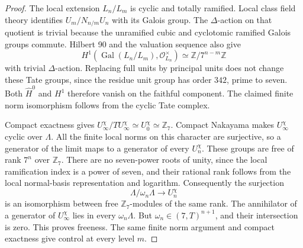 \begin{proof}
The local extension $L_n/L_m$ is cyclic and totally ramified.
Local class field theory identifies
$U_m/N_{n/m}U_n$ with its Galois group. The $\Delta$-action on that
quotient is trivial because the unramified cubic and cyclotomic
ramified Galois groups commute. Hilbert 90 and the valuation sequence
also give
\[
 H^1(\operatorname{Gal}(L_n/L_m),\mathcal O_{L_n}^\times)
 \simeq\mathbb Z/7^{n-m}\mathbb Z
\]
with trivial $\Delta$-action. Replacing full units by principal units
does not change these Tate groups, since the residue unit group has
order $342$, prime to seven. Both
$\widehat H^0$ and $H^1$ therefore vanish on the faithful component.
The claimed finite norm isomorphism follows from the cyclic Tate
complex.

Compact exactness gives
$U_\infty^\chi/TU_\infty^\chi\simeq U_0^\chi\simeq\mathbb Z_7$.
Compact Nakayama makes $U_\infty^\chi$ cyclic over $\Lambda$.
All the finite local norms on this character are surjective, so a
generator of the limit maps to a generator of every $U_n^\chi$.
These groups are free of rank $7^n$ over $\mathbb Z_7$. There are no
seven-power roots of unity, since the local ramification index is a
power of seven, and their rational rank follows from the local
normal-basis representation and logarithm. Consequently the
surjection
\[
 \Lambda/\omega_n\Lambda\longrightarrow U_n^\chi
\]
is an isomorphism between free $\mathbb Z_7$-modules of the same rank.
The annihilator of a generator of $U_\infty^\chi$ lies in every
$\omega_n\Lambda$. But $\omega_n\in(7,T)^{n+1}$, and their intersection
is zero. This proves freeness. The same finite norm argument and
compact exactness give control at every level $m$.
\end{proof}

